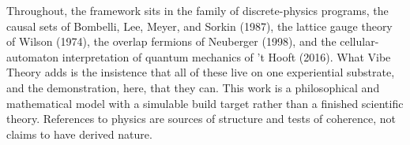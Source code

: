 Throughout, the framework sits in the family of discrete-physics programs, the causal
sets of Bombelli, Lee, Meyer, and Sorkin (1987), the lattice gauge theory of Wilson
(1974), the overlap fermions of Neuberger (1998), and the cellular-automaton
interpretation of quantum mechanics of 't Hooft (2016). What Vibe Theory adds is the
insistence that all of these live on one experiential substrate, and the demonstration,
here, that they can. This work is a philosophical and mathematical model with a
simulable build target rather than a finished scientific theory. References to physics
are sources of structure and tests of coherence, not claims to have derived nature.
